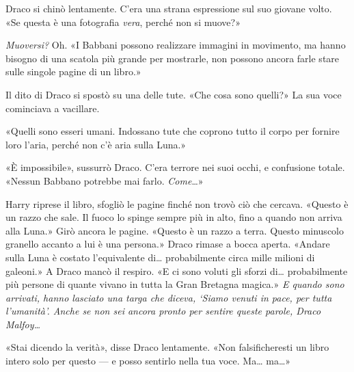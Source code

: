 Draco si chinò lentamente. C’era una strana espressione sul suo giovane volto. «Se questa è una fotografia \textit{vera}, perché non si muove?»

\textit{Muoversi?} Oh. «I Babbani possono realizzare immagini in movimento, ma hanno bisogno di una scatola più grande per mostrarle, non possono ancora farle stare sulle singole pagine di un libro.»

Il dito di Draco si spostò su una delle tute. «Che cosa sono quelli?» La sua voce cominciava a vacillare.

«Quelli sono esseri umani. Indossano tute che coprono tutto il corpo per fornire loro l’aria, perché non c’è aria sulla Luna.»

«È impossibile», sussurrò Draco. C’era terrore nei suoi occhi, e confusione totale. «Nessun Babbano potrebbe mai farlo. \textit{Come}…»

Harry riprese il libro, sfogliò le pagine finché non trovò ciò che cercava. «Questo è un razzo che sale. Il fuoco lo spinge sempre più in alto, fino a quando non arriva alla Luna.» Girò ancora le pagine. «Questo è un razzo a terra. Questo minuscolo granello accanto a lui è una persona.» Draco rimase a bocca aperta. «Andare sulla Luna è costato l’equivalente di… probabilmente circa mille milioni di galeoni.» A Draco mancò il respiro. «E ci sono voluti gli sforzi di… probabilmente più persone di quante vivano in tutta la Gran Bretagna magica.» \textit{E quando sono arrivati, hanno lasciato una targa che diceva, ‘Siamo venuti in pace, per tutta l’umanità’. Anche se non sei ancora pronto per sentire queste parole, Draco Malfoy…}

«Stai dicendo la verità», disse Draco lentamente. «Non falsificheresti un libro intero solo per questo — e posso sentirlo nella tua voce. Ma… ma…»

